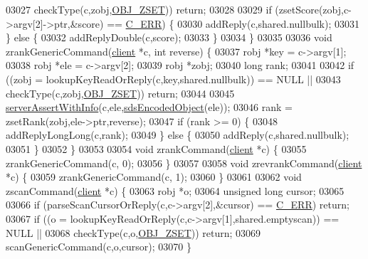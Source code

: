 \begin{DoxyCode}
03027         checkType(c,zobj,\hyperlink{server_8h_a8c356422ddbc03bd77694880a30a1953}{OBJ\_ZSET})) \textcolor{keywordflow}{return};
03028 
03029     \textcolor{keywordflow}{if} (zsetScore(zobj,c->argv[2]->ptr,&score) == \hyperlink{server_8h_af98ac28d5f4d23d7ed5985188e6fb7d1}{C\_ERR}) \{
03030         addReply(c,shared.nullbulk);
03031     \} \textcolor{keywordflow}{else} \{
03032         addReplyDouble(c,score);
03033     \}
03034 \}
03035 
03036 \textcolor{keywordtype}{void} zrankGenericCommand(\hyperlink{structclient}{client} *c, \textcolor{keywordtype}{int} reverse) \{
03037     robj *key = c->argv[1];
03038     robj *ele = c->argv[2];
03039     robj *zobj;
03040     \textcolor{keywordtype}{long} rank;
03041 
03042     \textcolor{keywordflow}{if} ((zobj = lookupKeyReadOrReply(c,key,shared.nullbulk)) == NULL ||
03043         checkType(c,zobj,\hyperlink{server_8h_a8c356422ddbc03bd77694880a30a1953}{OBJ\_ZSET})) \textcolor{keywordflow}{return};
03044 
03045     \hyperlink{server_8h_a7308f76cbff9a8d3797fe78190b91282}{serverAssertWithInfo}(c,ele,\hyperlink{server_8h_afcfb5bd97af52d1dbce331745cae030c}{sdsEncodedObject}(ele));
03046     rank = zsetRank(zobj,ele->ptr,reverse);
03047     \textcolor{keywordflow}{if} (rank >= 0) \{
03048         addReplyLongLong(c,rank);
03049     \} \textcolor{keywordflow}{else} \{
03050         addReply(c,shared.nullbulk);
03051     \}
03052 \}
03053 
03054 \textcolor{keywordtype}{void} zrankCommand(\hyperlink{structclient}{client} *c) \{
03055     zrankGenericCommand(c, 0);
03056 \}
03057 
03058 \textcolor{keywordtype}{void} zrevrankCommand(\hyperlink{structclient}{client} *c) \{
03059     zrankGenericCommand(c, 1);
03060 \}
03061 
03062 \textcolor{keywordtype}{void} zscanCommand(\hyperlink{structclient}{client} *c) \{
03063     robj *o;
03064     \textcolor{keywordtype}{unsigned} \textcolor{keywordtype}{long} cursor;
03065 
03066     \textcolor{keywordflow}{if} (parseScanCursorOrReply(c,c->argv[2],&cursor) == \hyperlink{server_8h_af98ac28d5f4d23d7ed5985188e6fb7d1}{C\_ERR}) \textcolor{keywordflow}{return};
03067     \textcolor{keywordflow}{if} ((o = lookupKeyReadOrReply(c,c->argv[1],shared.emptyscan)) == NULL ||
03068         checkType(c,o,\hyperlink{server_8h_a8c356422ddbc03bd77694880a30a1953}{OBJ\_ZSET})) \textcolor{keywordflow}{return};
03069     scanGenericCommand(c,o,cursor);
03070 \}
\end{DoxyCode}
